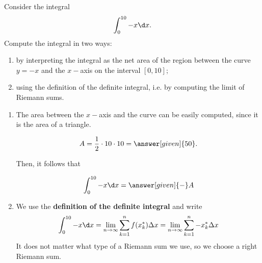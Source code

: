 \documentclass{ximera}
\begin{document}
\begin{example}
Consider the integral
\[
\int_0^{10}-x \d x.
\]
Compute the integral in two ways:
\begin{enumerate}
\item by interpreting the integral as the net area of the region between the curve $y=-x$ and the $x-$axis on the interval $[0,10]$;
\item using the definition of the definite integral, i.e. by computing the limit of Riemann sums.
\end{enumerate}
\begin{explanation}
\begin{enumerate}
\item The  area between the $x-$axis and the curve can be easily computed, since it is the area of a triangle.
\begin{image}
\end{image}

\[
A=\frac{1}{2}\cdot 10\cdot10=\answer[given]{50}.
\]

Then, it follows that

\[
\int_0^{10}-x \d x=\answer[given]{-}A
\]
\item We use the \textbf{definition of the definite integral} and write
\[
\int_0^{10}-x \d x=\lim_{n\to\infty}\sum_{k=1}^n f(x_k^*)\Delta x=\lim_{n\to\infty}\sum_{k=1}^n -x_k^*\Delta x
\]
It does not matter what  type of a Riemann sum we use, so we choose a right Riemann sum.


\end{enumerate}
\end{explanation}
\end{example}
\end{document}
